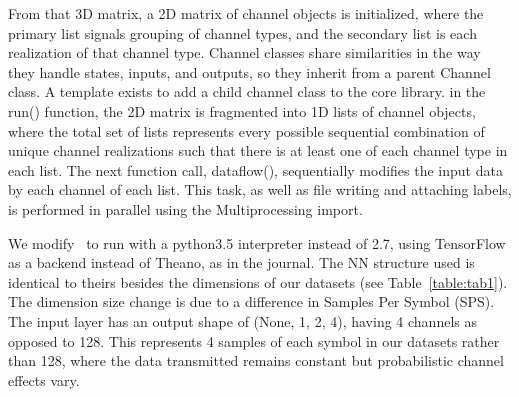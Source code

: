 From that 3D matrix, a 2D matrix of channel objects is initialized, where the primary list signals grouping of channel types, and the secondary list is each realization of that channel type. Channel classes share similarities in the way they handle states, inputs, and outputs, so they inherit from a parent Channel class. A template exists to add a child channel class to the core library. in the run() function, the 2D matrix is fragmented into 1D lists of channel objects, where the total set of lists represents every possible sequential combination of unique channel realizations such that there is at least one of each channel type in each list. The next function call, dataflow(), sequentially modifies the input data by each channel of each list. This task, as well as file writing and attaching labels, is performed in parallel using the Multiprocessing import.

We modify~\cite{convnetmodrec} to run with a python3.5 interpreter instead of 2.7, using TensorFlow as a backend instead of Theano, as in the journal. The NN structure used is identical to theirs besides the dimensions of our datasets (see Table~\ref{table:tab1}). The dimension size change is due to a difference in Samples Per Symbol (SPS). The input layer has an output shape of (None, 1, 2, 4), having 4 channels as opposed to 128. This represents 4 samples of each symbol in our datasets rather than 128, where the data transmitted remains constant but probabilistic channel effects vary.

